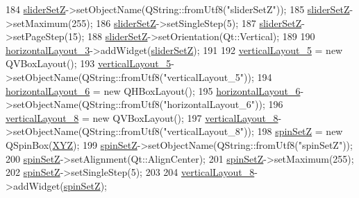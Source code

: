 \begin{DoxyCode}
184         \hyperlink{class_ui___e3_p_j_r_a6ef8bc7a96e71c14d44d1573f43506d4}{sliderSetZ}->setObjectName(QString::fromUtf8(\textcolor{stringliteral}{"sliderSetZ"}));
185         \hyperlink{class_ui___e3_p_j_r_a6ef8bc7a96e71c14d44d1573f43506d4}{sliderSetZ}->setMaximum(255);
186         \hyperlink{class_ui___e3_p_j_r_a6ef8bc7a96e71c14d44d1573f43506d4}{sliderSetZ}->setSingleStep(5);
187         \hyperlink{class_ui___e3_p_j_r_a6ef8bc7a96e71c14d44d1573f43506d4}{sliderSetZ}->setPageStep(15);
188         \hyperlink{class_ui___e3_p_j_r_a6ef8bc7a96e71c14d44d1573f43506d4}{sliderSetZ}->setOrientation(Qt::Vertical);
189 
190         \hyperlink{class_ui___e3_p_j_r_af1b2167ad3027fe2c2328701164e54ec}{horizontalLayout\_3}->addWidget(\hyperlink{class_ui___e3_p_j_r_a6ef8bc7a96e71c14d44d1573f43506d4}{sliderSetZ});
191 
192         \hyperlink{class_ui___e3_p_j_r_acbe0600e63ca9c63fe807730289e677a}{verticalLayout\_5} = \textcolor{keyword}{new} QVBoxLayout();
193         \hyperlink{class_ui___e3_p_j_r_acbe0600e63ca9c63fe807730289e677a}{verticalLayout\_5}->setObjectName(QString::fromUtf8(\textcolor{stringliteral}{"verticalLayout\_5"}));
194         \hyperlink{class_ui___e3_p_j_r_aee7bbbb4f14e80e5c3821623d9c4d52b}{horizontalLayout\_6} = \textcolor{keyword}{new} QHBoxLayout();
195         \hyperlink{class_ui___e3_p_j_r_aee7bbbb4f14e80e5c3821623d9c4d52b}{horizontalLayout\_6}->setObjectName(QString::fromUtf8(\textcolor{stringliteral}{"horizontalLayout\_6"}));
196         \hyperlink{class_ui___e3_p_j_r_aecbd2cafbe12abcd4a5a7865aad8d917}{verticalLayout\_8} = \textcolor{keyword}{new} QVBoxLayout();
197         \hyperlink{class_ui___e3_p_j_r_aecbd2cafbe12abcd4a5a7865aad8d917}{verticalLayout\_8}->setObjectName(QString::fromUtf8(\textcolor{stringliteral}{"verticalLayout\_8"}));
198         \hyperlink{class_ui___e3_p_j_r_a1c5f1bef8dc94bae1a91139a37d1d881}{spinSetZ} = \textcolor{keyword}{new} QSpinBox(\hyperlink{class_ui___e3_p_j_r_a098a80b873d9e0a09fd834f09e5028b4}{XYZ});
199         \hyperlink{class_ui___e3_p_j_r_a1c5f1bef8dc94bae1a91139a37d1d881}{spinSetZ}->setObjectName(QString::fromUtf8(\textcolor{stringliteral}{"spinSetZ"}));
200         \hyperlink{class_ui___e3_p_j_r_a1c5f1bef8dc94bae1a91139a37d1d881}{spinSetZ}->setAlignment(Qt::AlignCenter);
201         \hyperlink{class_ui___e3_p_j_r_a1c5f1bef8dc94bae1a91139a37d1d881}{spinSetZ}->setMaximum(255);
202         \hyperlink{class_ui___e3_p_j_r_a1c5f1bef8dc94bae1a91139a37d1d881}{spinSetZ}->setSingleStep(5);
203 
204         \hyperlink{class_ui___e3_p_j_r_aecbd2cafbe12abcd4a5a7865aad8d917}{verticalLayout\_8}->addWidget(\hyperlink{class_ui___e3_p_j_r_a1c5f1bef8dc94bae1a91139a37d1d881}{spinSetZ});

\end{DoxyCode}

